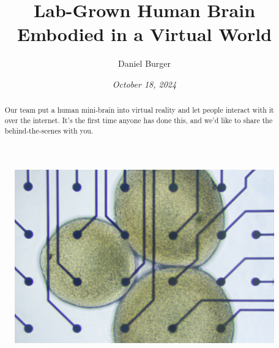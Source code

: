 \documentclass[10pt]{article}
\begin{document}
\setlength{\footskip}{65pt}


\title{\textbf{Lab-Grown Human Brain \\ Embodied in a Virtual World}}
\author[1]{Daniel Burger}
\date{\textit{October 18, 2024}}
\maketitle
\thispagestyle{empty}

\begin{sloppypar}

  \begin{figure}[ht]
    \centering
    \includegraphics[width=\textwidth]{figures/cover.jpg}
    \label{fig:cover}
  \end{figure}

  \begin{abstract}
    Our team put a human mini-brain into virtual reality and let people interact with it over the internet. It's the first time anyone has done this, and we'd like to share the behind-the-scenes with you.
  \end{abstract}

  \pagebreak
  \tableofcontents
  \pagebreak
  \listoffigures
  \pagebreak
  \listoftables
  \pagebreak
  \lstlistoflistings
  \pagebreak


\end{sloppypar}
\end{document}
